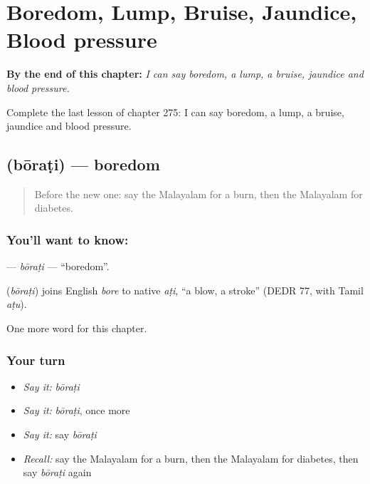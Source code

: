 
\chapter{Boredom, Lump, Bruise, Jaundice, Blood pressure}
\label{ch:ml-boredom-lump-bruise-jaundice-blood-pressure}

\begin{chapteropening}
\textbf{By the end of this chapter:} \emph{I can say boredom, a lump, a bruise, jaundice and blood pressure.}

Complete the last lesson of chapter 275: I can say boredom, a lump, a bruise, jaundice and blood pressure.
\end{chapteropening}

\section[\texorpdfstring{\ml{ബോറടി} (bōraṭi)}{ബോറടി (bōraṭi)}]{ (bōraṭi) — boredom}

\label{lesson:ML-C275-borati}



\begin{quote}
Before the new one: say the Malayalam for a burn, then the Malayalam for diabetes.
\end{quote}

\subsection*{You'll want to know: }
\textbf{} — \emph{bōraṭi} — \textquotedblleft{}boredom\textquotedblright{}.

\begin{cousinweb}
\textbf{} (\emph{bōraṭi}) joins English \emph{bore} to native \emph{aṭi}, \textquotedblleft{}a blow, a stroke\textquotedblright{} (DEDR 77, with Tamil \emph{aṭu}).
\end{cousinweb}

\begin{grammarlens}[title={What you've built}]
One more word for this chapter.
\end{grammarlens}

\subsection*{Your turn}
\begin{itemize}
\raggedright
  \item \emph{Say it:} \emph{bōraṭi}
  \item \emph{Say it:} \emph{bōraṭi}, once more
  \item \emph{Say it:} say \emph{bōraṭi}
  \item \emph{Recall:} say the Malayalam for a burn, then the Malayalam for diabetes, then say \emph{bōraṭi} again
\end{itemize}

